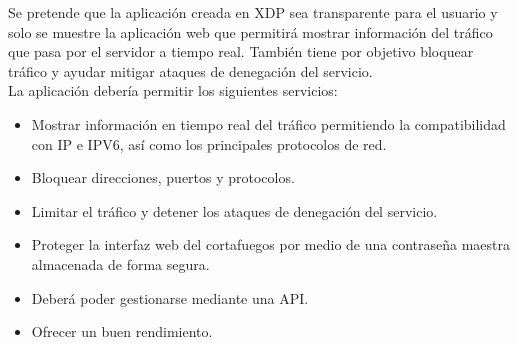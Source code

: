 Se pretende que la aplicación creada en XDP sea transparente para el usuario y solo se muestre la aplicación web que permitirá mostrar información del tráfico que pasa por el servidor a tiempo real. También tiene por objetivo bloquear tráfico y ayudar mitigar ataques de denegación del servicio.
\\La aplicación debería permitir los siguientes servicios:
\begin{itemize}
        \item Mostrar información en tiempo real del tráfico permitiendo la compatibilidad con IP e IPV6, así como los principales protocolos de red.
        \item Bloquear direcciones, puertos y protocolos.
        \item Limitar el tráfico y detener los ataques de denegación del servicio.
        \item Proteger la interfaz web del cortafuegos por medio de una contraseña maestra almacenada de forma segura.
        \item Deberá poder gestionarse mediante una API.
        \item Ofrecer un buen rendimiento.
\end{itemize}